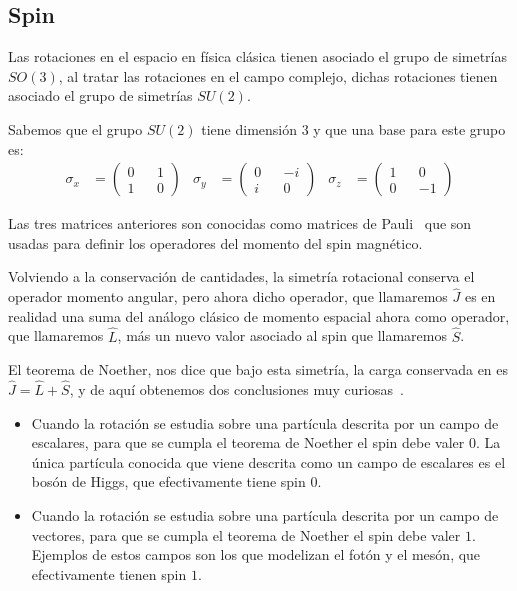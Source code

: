 \subsection{Spin}\label{sec:spin}
Las rotaciones en el espacio en física clásica tienen asociado el grupo de simetrías $SO(3)$, al tratar las rotaciones en el campo complejo, dichas rotaciones tienen asociado el grupo de simetrías $SU(2)$.

Sabemos que el grupo $SU(2)$ tiene dimensión $3$ y que una base para este grupo es:
\begin{align}
	\sigma_x & = \begin{pmatrix} 0 && 1 \\ 1 && 0 \end{pmatrix} &
	\sigma_y & = \begin{pmatrix} 0 && -i \\ i && 0 \end{pmatrix} &
	\sigma_z & = \begin{pmatrix} 1 && 0 \\ 0 && -1 \end{pmatrix}
\end{align}

Las tres matrices anteriores son conocidas como matrices de Pauli~\autocite[50]{IQC} que son usadas para definir los operadores del momento del spin magnético.

Volviendo a la conservación de cantidades, la simetría rotacional conserva el operador momento angular, pero ahora dicho operador, que llamaremos $\hat{J}$ es en realidad una suma del análogo clásico de momento espacial ahora como operador, que llamaremos $\hat{L}$, más un nuevo valor asociado al spin que llamaremos $\hat{S}$.

El teorema de Noether, nos dice que bajo esta simetría, la carga conservada en es $\hat{J}=\hat{L}+\hat{S}$, y de aquí obtenemos dos conclusiones muy curiosas~\autocite[45]{QMS}.
\begin{itemize}
	\item Cuando la rotación se estudia sobre una partícula descrita por un campo de escalares, para que se cumpla el teorema de Noether el spin debe valer $0$. La única partícula conocida que viene descrita como un campo de escalares es el bosón de Higgs, que efectivamente tiene spin $0$.
	\item Cuando la rotación se estudia sobre una partícula descrita por un campo de vectores, para que se cumpla el teorema de Noether el spin debe valer $1$. Ejemplos de estos campos son los que modelizan el fotón y el mesón, que efectivamente tienen spin $1$.
\end{itemize}

